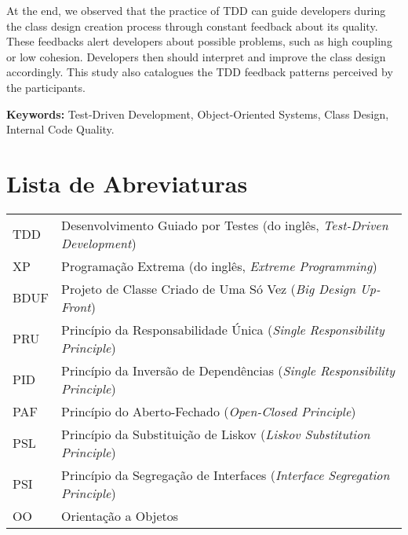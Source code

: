 \documentclass[11pt,openany,twoside,a4paper]{book}
\begin{document}
At the end, we observed that the practice of TDD can guide developers during the 
class design creation process through constant feedback about its quality.
These feedbacks alert developers about possible problems, such as high coupling or
low cohesion. Developers then should interpret and improve the class design accordingly.
This study also catalogues the TDD feedback patterns perceived by the participants.

\noindent \textbf{Keywords:} Test-Driven Development, Object-Oriented
Systems, Class Design, Internal Code Quality.

\tableofcontents    %

\chapter{Lista de Abreviaturas}
\begin{tabular}{ll}
         TDD         & Desenvolvimento Guiado por Testes (do inglês, \emph{Test-Driven Development})\\ 
         
         XP          & Programação Extrema (do inglês, \emph{Extreme Programming})\\
		 
		 BDUF		 & Projeto de Classe Criado de Uma Só Vez (\textit{Big Design Up-Front})\\
		 
		 PRU		 & Princípio da Responsabilidade Única (\emph{Single Responsibility
		 Principle})\\
		 
		 PID		 & Princípio da Inversão de Dependências (\emph{Single Responsibility
		 Principle})\\ 
		 
		 PAF		 & Princípio do Aberto-Fechado (\emph{Open-Closed Principle})\\
		 
		 PSL	 	 & Princípio da Substituição de Liskov (\emph{Liskov Substitution
		 Principle})\\
		 
		 PSI		 & Princípio da Segregação de Interfaces (\emph{Interface Segregation
		 Principle})\\
		 
		 OO		 	 & Orientação a Objetos
		 
\end{tabular}
\end{document}
